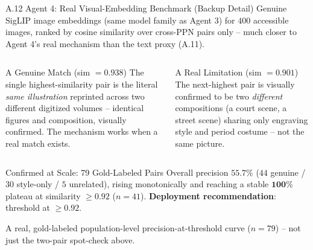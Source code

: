 \documentclass[aspectratio=169,11pt]{beamer}
\begin{document}
\begin{frame}{A.12 Agent 4: Real Visual-Embedding Benchmark (Backup Detail)}
\scriptsize
Genuine SigLIP image embeddings (same model family as Agent 3) for $400$ accessible images, ranked by cosine similarity over cross-PPN pairs only -- much closer to Agent 4's real mechanism than the text proxy (A.11).
\begin{columns}[T]
\begin{block}{A Genuine Match (sim $=0.938$)}
The single highest-similarity pair is the literal \emph{same illustration} reprinted across two different digitized volumes -- identical figures and composition, visually confirmed. The mechanism works when a real match exists.
\end{block}

\begin{alertblock}{A Real Limitation (sim $=0.901$)}
The next-highest pair is visually confirmed to be two \emph{different} compositions (a court scene, a street scene) sharing only engraving style and period costume -- not the same picture.
\end{alertblock}
\end{columns}
\begin{block}{Confirmed at Scale: 79 Gold-Labeled Pairs}
Overall precision $\mathbf{55.7\%}$ ($44$ genuine / $30$ style-only / $5$ unrelated), rising monotonically and reaching a stable $\mathbf{100\%}$ plateau at similarity $\ge 0.92$ ($n=41$). \textbf{Deployment recommendation}: threshold at $\ge 0.92$.
\end{block}
{\tiny\color{PrismGray} A real, gold-labeled population-level precision-at-threshold curve ($n=79$) -- not just the two-pair spot-check above.}
\end{frame}
\end{document}
